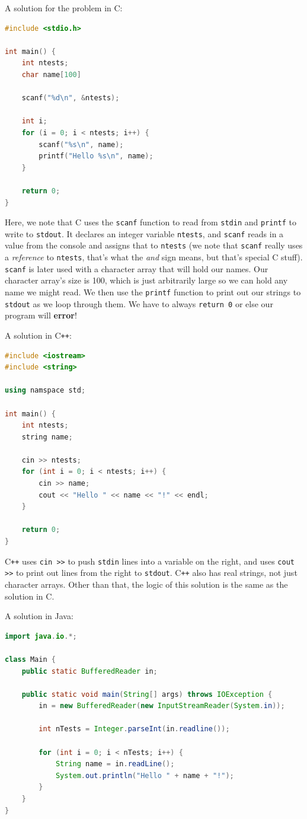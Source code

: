 \documentclass[a4paper]{article}
\begin{document}
A solution for the problem in C:
\begin{lstlisting}[language=C]
#include <stdio.h>

int main() {
    int ntests;
    char name[100]

    scanf("%d\n", &ntests);

    int i;
    for (i = 0; i < ntests; i++) {
        scanf("%s\n", name);
        printf("Hello %s\n", name);
    }

    return 0;
}
\end{lstlisting}

Here, we note that C uses the \texttt{scanf} function to read from \texttt{stdin} and \texttt{printf} to write to \texttt{stdout}. It declares an integer variable \texttt{ntests}, and \texttt{scanf} reads in a value from the console and assigns that to \texttt{ntests} (we note that \texttt{scanf} really uses a \textit{reference} to \texttt{ntests}, that's what the \textit{and} sign means, but that's special C stuff). \texttt{scanf} is later used with a character array that will hold our names. Our character array's size is 100, which is just arbitrarily large so we can hold any name we might read. We then use the \texttt{printf} function to print out our strings to \texttt{stdout} as we loop through them. We have to always \texttt{return 0} or else our program will \textbf{error}! 

A solution in C\texttt{++}:
\begin{lstlisting}[language=C++]
#include <iostream>
#include <string>

using namspace std;

int main() {
    int ntests;
    string name;

    cin >> ntests;
    for (int i = 0; i < ntests; i++) {
        cin >> name;
        cout << "Hello " << name << "!" << endl;
    }

    return 0;
}
\end{lstlisting}

C\texttt{++} uses \texttt{cin >>} to push \texttt{stdin} lines into a variable on the right, and uses \texttt{cout >>} to print out lines from the right to \texttt{stdout}. C\texttt{++} also has real strings, not just character arrays. Other than that, the logic of this solution is the same as the solution in C.

A solution in Java:
\begin{lstlisting}[language=Java]
import java.io.*;

class Main {
    public static BufferedReader in;

    public static void main(String[] args) throws IOException {
        in = new BufferedReader(new InputStreamReader(System.in));

        int nTests = Integer.parseInt(in.readline());

        for (int i = 0; i < nTests; i++) {
            String name = in.readLine();
            System.out.println("Hello " + name + "!");
        }
    }
}
\end{lstlisting}
\end{document}
